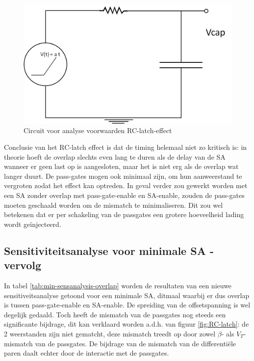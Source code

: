 \begin{figure}
  \centering
  \includegraphics[scale=0.4]{../fig/hfdstk-sensamp-RC-latch-maplecircuit.png}
  \caption[Circuit voor analyse voorwaarden RC-latch-effect]{Circuit voor analyse voorwaarden RC-latch-effect}
  \label{fig:RC-latch-maplecircuit}
\end{figure}

Conclusie van het RC-latch effect is dat de timing helemaal niet zo kritisch is: in theorie hoeft de overlap slechts even lang te duren als de delay van de SA wanneer er geen last op is aangesloten, maar het is niet erg als de overlap wat langer duurt.
De pass-gates mogen ook minimaal zijn, om hun aanweerstand te vergroten zodat het effect kan optreden.
In geval verder zou gewerkt worden met een SA zonder overlap met pass-gate-enable en SA-enable, zouden de pass-gates moeten geschaald worden om de mismatch te minimaliseren. Dit zou wel betekenen dat er per schakeling van de passgates een grotere hoeveelheid lading wordt geïnjecteerd.


\subsection{Sensitiviteitsanalyse voor minimale SA - vervolg}

In tabel \ref{tab:min-sensanalysis-overlap} worden de resultaten van een nieuwe sensitiveitsanalyse getoond voor een minimale SA, ditmaal waarbij er dus overlap is tussen pass-gate-enable en SA-enable. De spreiding van de offsetspanning is wel degelijk gedaald. Toch heeft de mismatch van de passgates nog steeds een significante bijdrage, dit kan verklaard worden a.d.h. van figuur \ref{fig:RC-latch}: de 2 weerstanden zijn niet gematcht, deze mismatch treedt op door zowel $\beta$- als $V_{T}$-mismatch van de passgates. De bijdrage van de mismatch van de differentiële paren daalt echter door de interactie met de passgates.

